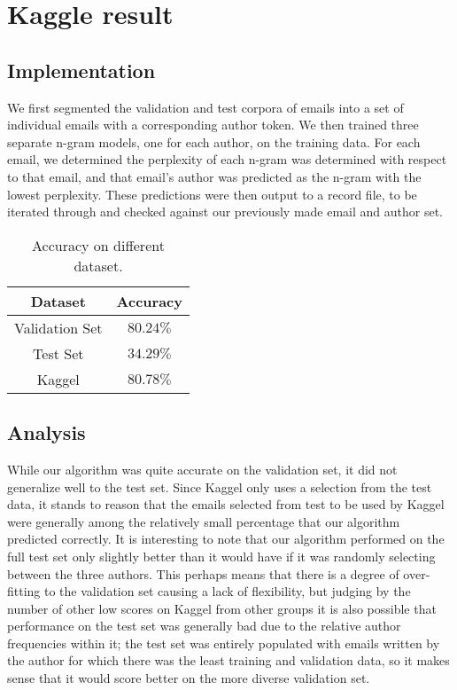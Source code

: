 \documentclass[12pt]{article}
\begin{document}
\section{Kaggle result}

\subsection{Implementation}
 We first segmented the validation and test corpora of emails into a set of individual emails with a corresponding author token. We then trained three separate n-gram models, one for each author, on the training data. For each email, we determined the perplexity of each n-gram was determined with respect to that email, and that email’s author was predicted as the n-gram with the lowest perplexity. These predictions were then output to a record file, to be iterated through and checked against our previously made email and author set.
\begin{table}[htb]
\begin{center}
\begin{tabular}{|c|c|}
\hline
\textbf{Dataset} & \textbf{Accuracy}\\
\hline
Validation Set & $80.24\%$\\
\hline
Test Set & $34.29\%$\\
\hline
Kaggel & $80.78\%$\\
\hline
\end{tabular}
\caption{\label{table:kaggle-result}Accuracy on different dataset.}
\end{center}
\end{table}


\subsection{Analysis}
While our algorithm was quite accurate on the validation set, it did not generalize well to the test set.  Since Kaggel only uses a selection from the test data, it stands to reason that the emails selected from test to be used by Kaggel were generally among the relatively small percentage that our algorithm predicted correctly.  It is interesting to note that our algorithm performed on the full test set only slightly better than it would have if it was randomly selecting between the three authors.  This perhaps means that there is a degree of over-fitting to the validation set causing a lack of flexibility, but judging by the number of other low scores on Kaggel from other groups it is also possible that performance on the test set was generally bad due to the relative author frequencies within it; the test set was entirely populated with emails written by the author for which there was the least training and validation data, so it makes sense that it would score better on the more diverse validation set.



\end{document}
